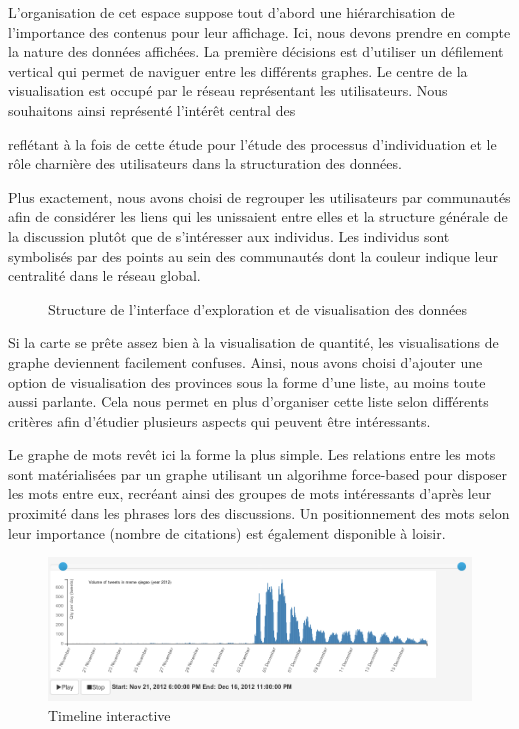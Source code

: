     L'organisation de cet espace suppose tout d'abord une hiérarchisation de l'importance des contenus pour leur affichage. Ici, nous devons prendre en compte la nature des données affichées. La première décisions est d'utiliser un défilement vertical qui permet de naviguer entre les différents graphes. Le centre de la visualisation est occupé par le réseau représentant les utilisateurs. Nous souhaitons ainsi représenté l{\textquoteright}intérêt central des

    reflétant à la fois  de cette étude pour l{\textquoteright}étude des processus d{\textquoteright}individuation et le r\^ole charnière des utilisateurs dans la structuration des données.


  Plus exactement, nous avons choisi de regrouper les utilisateurs par communautés afin de considérer les liens qui les unissaient entre elles et la structure générale de la discussion plut\^ot que de s{\textquoteright}intéresser aux individus. Les individus sont symbolisés par des points au sein des communautés dont la couleur indique leur centralité dans le réseau global.

    \begin{figure}
        \label{fig:schema-viz}
        \centering
        \caption{Structure de l'interface d'exploration et de visualisation des données}
    \end{figure}

    Si la carte se prête assez bien à la visualisation de quantité, les visualisations de graphe deviennent facilement confuses. Ainsi, nous avons choisi d{\textquoteright}ajouter une option de visualisation des provinces sous la forme d{\textquoteright}une liste, au moins toute aussi parlante. Cela nous permet en plus d{\textquoteright}organiser cette liste selon différents critères afin d{\textquoteright}étudier plusieurs aspects qui peuvent être intéressants.

    Le graphe de mots revêt ici la forme la plus simple. Les relations entre les mots sont matérialisées par un graphe utilisant un algorihme force-based pour disposer les mots entre eux, recréant ainsi des groupes de mots intéressants d{\textquoteright}après leur proximité dans les phrases lors des discussions. Un positionnement des mots selon leur importance (nombre de citations) est également disponible à loisir.

    \begin{figure}
        \label{fig:ui-timeline}
        \centering
        \includegraphics[scale=0.4]{figures/chap4/ui/ui-timeline.png}
        \caption{Timeline interactive}
    \end{figure}


